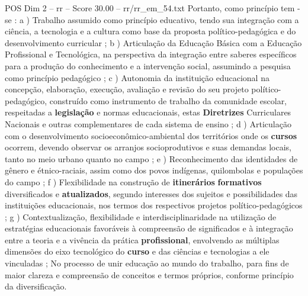\begin{textsample}{POS Dim 2 – rr – Score 30.00 – rr/rr\_em\_54.txt}
Portanto, como princípio tem -se : a ) Trabalho assumido como princípio educativo, tendo sua integração com a ciência, a tecnologia e a cultura como base da proposta político-pedagógica e do desenvolvimento curricular ; b ) Articulação da Educação Básica com a Educação Profissional e Tecnológica, na perspectiva da integração entre saberes específicos para a produção do conhecimento e a intervenção social, assumindo a pesquisa como princípio pedagógico ; c ) Autonomia da instituição educacional na concepção, elaboração, execução, avaliação e revisão do seu projeto político-pedagógico, construído como instrumento de trabalho da comunidade escolar, respeitadas a \textbf{legislação} e normas educacionais, estas \textbf{Diretrizes} Curriculares Nacionais e outras complementares de cada sistema de ensino ; d ) Articulação com o desenvolvimento socioeconômico-ambiental dos territórios onde os \textbf{cursos} ocorrem, devendo observar os arranjos socioprodutivos e suas demandas locais, tanto no meio urbano quanto no campo ; e ) Reconhecimento das identidades de gênero e étnico-raciais, assim como dos povos indígenas, quilombolas e populações do campo ; f ) Flexibilidade na construção de \textbf{itinerários} \textbf{formativos} diversificados e \textbf{atualizados}, segundo interesses dos sujeitos e possibilidades das instituições educacionais, nos termos dos respectivos projetos político-pedagógicos ; g ) Contextualização, flexibilidade e interdisciplinaridade na utilização de estratégias educacionais favoráveis à compreensão de significados e à integração entre a teoria e a vivência da prática \textbf{profissional}, envolvendo as múltiplas dimensões do eixo tecnológico do \textbf{curso} e das ciências e tecnologias a ele vinculadas ; No processo de unir educação ao mundo do trabalho, para fins de maior clareza e compreensão de conceitos e termos próprios, conforme princípio da diversificação.

\end{textsample}
